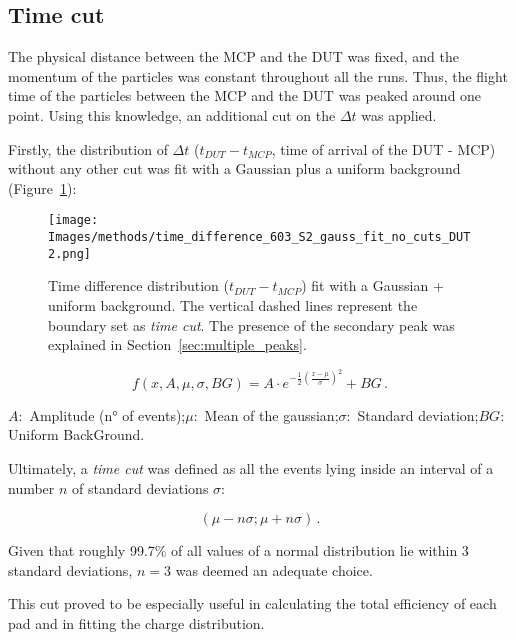 \subsection{Time cut}\label{subsec:time_cut}

The physical distance between the MCP and the DUT was fixed, and the momentum of the particles was constant throughout all the runs. Thus, the flight time of the particles between the MCP and the DUT was peaked around one point. Using this knowledge, an additional cut on the \(\Delta t\) was applied.

Firstly, the distribution of \(\Delta t\) (\(t_{DUT}-t_{MCP}\), time of arrival of the DUT - MCP) without any other cut was fit with a Gaussian plus a uniform background (Figure~\ref{fig:time_cut_gauss+bg_fit}):

\begin{figure}[h!tbp]
    \centering
    \texttt{[image: Images/methods/time\_difference\_603\_S2\_gauss\_fit\_no\_cuts\_DUT2.png]}
    \captionsetup{width=\captionwidth}
    \caption{Time difference distribution (\(t_{DUT}-t_{MCP}\)) fit with a Gaussian + uniform background. The vertical dashed lines represent the boundary set as \textit{time cut}. The presence of the secondary peak was explained in Section~\ref{sec:multiple_peaks}.}
    \label{fig:time_cut_gauss+bg_fit}
\end{figure}

\begin{equation*}
    f(x,A,\mu,\sigma,BG) = A \cdot e^{-\frac{1}{2}\left(\frac{x-\mu}{\sigma} \right)^2} + BG  \, .
\end{equation*}

\(A:\) Amplitude (n° of events);\quad \(\mu:\) Mean of the gaussian;\quad \(\sigma:\) Standard deviation;\quad \(BG:\) Uniform BackGround.

Ultimately, a \textit{time cut} was defined as all the events lying inside an interval of a number \(n\) of standard deviations \(\sigma\):

\begin{equation}
    (\mu-n\sigma;\mu+n\sigma) \, .
\end{equation}

Given that roughly 99.7\% of all values of a normal distribution lie within 3 standard deviations, \(n=3\) was deemed an adequate choice.

This cut proved to be especially useful in calculating the total efficiency of each pad and in fitting the charge distribution.

